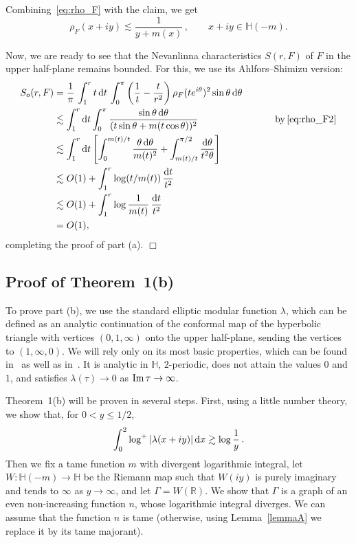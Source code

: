\documentclass[12pt]{paper}
\newcommand{\bR}{\mathbb R}
\newcommand{\bH}{\mathbb H}
\newcommand{\la}{\lambda}
\begin{document}
Combining~\eqref{eq:rho_F} with the claim, we get
\begin{equation}\label{eq:rho_F2}
\rho_F(x+iy)  \lesssim \frac1{y+m(x)}\,, 
\qquad x+iy\in \bH(-m).
\end{equation}

Now, we are ready to see that the Nevanlinna characteristics $S(r, F)$ of $F$ in the upper half-plane
remains bounded. For this, we use its  Ahlfors--Shimizu version:
\begin{align*}
S_o(r, F) &= 
\frac1{\pi}\, \int_1^r  t\, {\rm d}t\, \int_0^\pi \left( \frac1t - \frac{t}{r^2} \right) \rho_F(te^{i\theta})^2 
\sin\theta \, {\rm d}\theta \\
&\lesssim \int_1^r {\rm d}t \int _0^\pi \frac{\sin\theta\, {\rm d}\theta}{(t\sin\theta + m(t\cos\theta))^2}
\qquad \qquad \qquad \qquad {\rm by\,} \eqref{eq:rho_F2} \\
&\lesssim \int_1^r {\rm d}t \left[ 
\int_0^{m(t)/t} \frac{\theta\, {\rm d}\theta}{m(t)^2} + \int_{m(t)/t}^{\pi/2} \frac{{\rm d}\theta}{t^2\theta} \right]
\\
&\lesssim O(1)+\int_1^r \log(t/m(t))\, \frac{{\rm d}t}{t^2}  \\
& \lesssim O(1)+\int_1^r \log\frac1{m(t)}\, \frac{{\rm d}t}{t^2} \\&= O(1),
\end{align*}
completing the proof of part (a). \hfill $\Box$


\subsection{Proof of Theorem~1(b)}\label{subsect:Thm1b}
To prove part (b), we use the standard elliptic modular function $\lambda$, which can be defined as an analytic 
continuation of the conformal map of the hyperbolic triangle with vertices $(0, 1, \infty)$ onto the upper half-plane, 
sending the vertices to $(1, \infty, 0)$. We will rely only on its most basic properties, 
which can be found in~\cite[Chapter~7, Sections~3.4, 3.5]{Ahlfors} as well as 
in~\cite[Section~23]{Akhiezer}.  
It is analytic in $\bH$, $2$-periodic, does not
attain the values $0$ and $1$, and satisfies $\lambda (\tau)\to 0$ as ${\rm Im\,}\tau\to \infty$.

\smallskip
Theorem~1(b) will be proven in several steps. 
First, using a little number theory, we show 
that, for $0<y\le 1/2$,
\[
\int_0^2 \log^+ |\la (x+iy)|\, {\rm d}x \gtrsim \log\frac1y\,.
\]
Then we fix a tame function $m$ with divergent logarithmic integral, let
$W\colon \bH(-m)\to\bH$ be the Riemann map such that $W(iy)$ is purely imaginary
and tends to $\infty$ as $y\to\infty$, and let $\Gamma = W(\bR)$. We show that 
$\Gamma$ is a graph of an even non-increasing function $n$, whose logarithmic
integral diverges. We can assume that the function
$n$ is tame (otherwise, using Lemma~\ref{lemmaA} we replace it by its
tame majorant).
\end{document}
